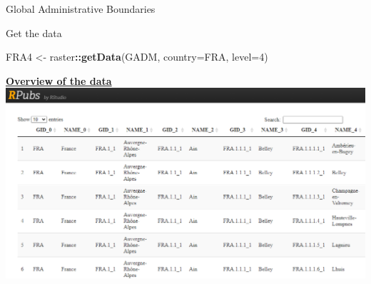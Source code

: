 \documentclass[
  ignorenonframetext,
]{beamer}
\newenvironment{Shaded}{\begin{snugshade}}{\end{snugshade}}
\newcommand{\DataTypeTok}[1]{\textcolor[rgb]{0.13,0.29,0.53}{#1}}
\newcommand{\DecValTok}[1]{\textcolor[rgb]{0.00,0.00,0.81}{#1}}
\newcommand{\KeywordTok}[1]{\textcolor[rgb]{0.13,0.29,0.53}{\textbf{#1}}}
\newcommand{\NormalTok}[1]{#1}
\newcommand{\OperatorTok}[1]{\textcolor[rgb]{0.81,0.36,0.00}{\textbf{#1}}}
\newcommand{\StringTok}[1]{\textcolor[rgb]{0.31,0.60,0.02}{#1}}
\begin{document}
\begin{frame}[fragile]{Global Administrative Boundaries}
\protect\hypertarget{global-administrative-boundaries}{}
\begin{block}{Get the data}
\protect\hypertarget{get-the-data}{}
\begin{Shaded}
\begin{Highlighting}[]
\NormalTok{FRA4 \textless{}{-}}\StringTok{ }\NormalTok{raster}\OperatorTok{::}\KeywordTok{getData}\NormalTok{(}\StringTok{\textquotesingle{}GADM\textquotesingle{}}\NormalTok{, }\DataTypeTok{country=}\StringTok{\textquotesingle{}FRA\textquotesingle{}}\NormalTok{, }
                        \DataTypeTok{level=}\DecValTok{4}\NormalTok{)}
\end{Highlighting}
\end{Shaded}
\end{block}

\begin{block}{\href{https://rpubs.com/Jan-Philipp_Kolb/FRA4}{\textbf{Overview
of the data}}}
\protect\hypertarget{overview-of-the-data}{}
\includegraphics{pics/FRA4_data_rpubs.PNG}
\end{block}
\end{frame}
\end{document}
